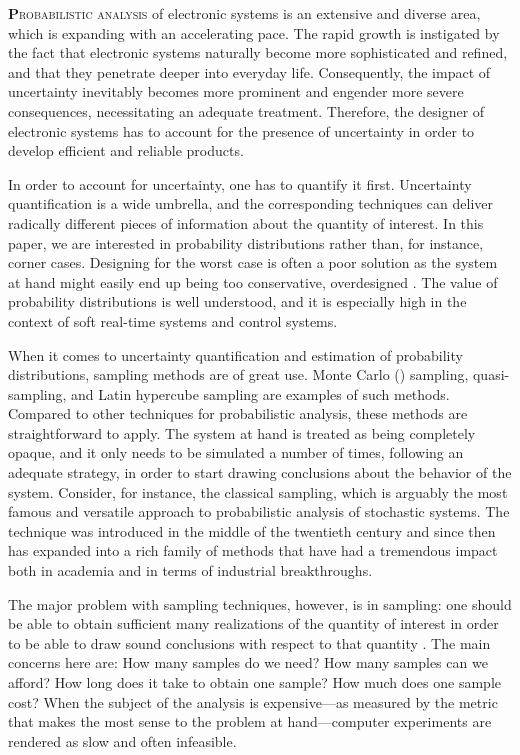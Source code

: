 \lettrine[findent=0.4em, nindent=0em]{\textbf{P}}{robabilistic analysis} of
electronic systems is an extensive and diverse area, which is expanding with an
accelerating pace. The rapid growth is instigated by the fact that electronic
systems naturally become more sophisticated and refined, and that they penetrate
deeper into everyday life. Consequently, the impact of uncertainty inevitably
becomes more prominent and engender more severe consequences, necessitating an
adequate treatment. Therefore, the designer of electronic systems has to account
for the presence of uncertainty in order to develop efficient and reliable
products.

In order to account for uncertainty, one has to quantify it first. Uncertainty
quantification is a wide umbrella, and the corresponding techniques can deliver
radically different pieces of information about the quantity of interest. In
this paper, we are interested in probability distributions rather than, for
instance, corner cases. Designing for the worst case is often a poor solution as
the system at hand might easily end up being too conservative, overdesigned
\cite{quinton2012}. The value of probability distributions is well understood,
and it is especially high in the context of soft real-time systems and control
systems.

When it comes to uncertainty quantification and estimation of probability
distributions, sampling methods are of great use. Monte Carlo ()
sampling, quasi- sampling, and Latin hypercube sampling are examples of
such methods. Compared to other techniques for probabilistic analysis, these
methods are straightforward to apply. The system at hand is treated as being
completely opaque, and it only needs to be simulated a number of times,
following an adequate strategy, in order to start drawing conclusions about the
behavior of the system. Consider, for instance, the classical 
sampling, which is arguably the most famous and versatile approach to
probabilistic analysis of stochastic systems. The technique was introduced in
the middle of the twentieth century and since then has expanded into a rich
family of methods that have had a tremendous impact both in academia and in
terms of industrial breakthroughs.

The major problem with sampling techniques, however, is in sampling: one should
be able to obtain sufficient many realizations of the quantity of interest in
order to be able to draw sound conclusions with respect to that quantity
\cite{diaz-emparanza2002}. The main concerns here are: How many samples do we
need? How many samples can we afford? How long does it take to obtain one
sample? How much does one sample cost? When the subject of the analysis is
expensive---as measured by the metric that makes the most sense to the problem
at hand---computer experiments are rendered as slow and often infeasible.

